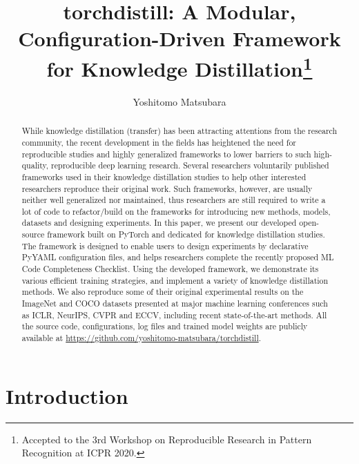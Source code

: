 \documentclass[runningheads]{llncs}
\begin{document}
\title{\textsf{torchdistill}: A Modular, Configuration-Driven Framework for Knowledge Distillation\thanks{Accepted to the 3rd Workshop on Reproducible Research in Pattern Recognition at ICPR 2020.}}
\author{Yoshitomo Matsubara}
\maketitle              \begin{abstract}
While knowledge distillation (transfer) has been attracting attentions from the research community, the recent development in the fields has heightened the need for reproducible studies and highly generalized frameworks to lower barriers to such high-quality, reproducible deep learning research.
Several researchers voluntarily published frameworks used in their knowledge distillation studies to help other interested researchers reproduce their original work.
Such frameworks, however, are usually neither well generalized nor maintained, thus researchers are still required to write a lot of code to refactor/build on the frameworks for introducing new methods, models, datasets and designing experiments.
In this paper, we present our developed open-source framework built on PyTorch and dedicated for knowledge distillation studies.
The framework is designed to enable users to design experiments by declarative PyYAML configuration files, and helps researchers complete the recently proposed ML Code Completeness Checklist.
Using the developed framework, we demonstrate its various efficient training strategies, and implement a variety of knowledge distillation methods.
We also reproduce some of their original experimental results on the ImageNet and COCO datasets presented at major machine learning conferences such as ICLR, NeurIPS, CVPR and ECCV, including recent state-of-the-art methods.
All the source code, configurations, log files and trained model weights are publicly available at \url{https://github.com/yoshitomo-matsubara/torchdistill}.

\end{abstract}
\section{Introduction}
\label{sec:intro}
\end{document}
